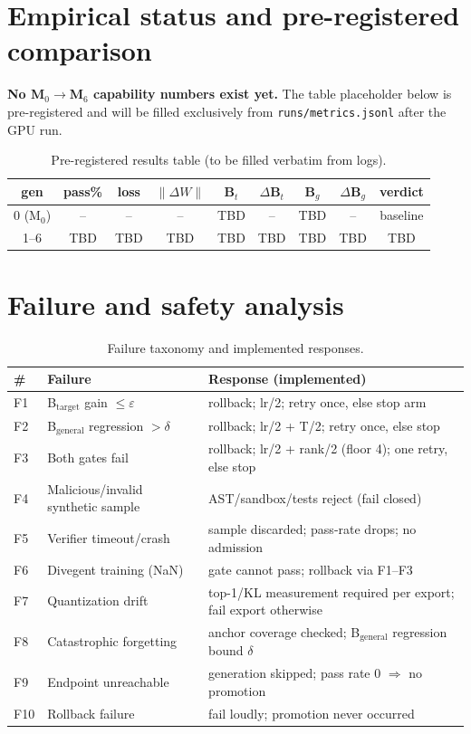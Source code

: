 \documentclass[11pt,a4paper]{article}
\begin{document}
\section{Empirical status and pre-registered comparison}\label{sec:pending}

\textbf{No M$_0{\rightarrow}$M$_6$ capability numbers exist yet.} The table
placeholder below is pre-registered and will be filled exclusively from
\texttt{runs/metrics.jsonl} after the GPU run.

\begin{table}[ht]
\centering
\small
\begin{tabular}{c c c c c c c c c}
\toprule
gen & pass\% & loss & $\lVert\Delta W\rVert$ & B$_t$ & $\Delta$B$_t$ & B$_g$ & $\Delta$B$_g$ & verdict \\
\midrule
0 (M$_0$) & -- & -- & -- & TBD & -- & TBD & -- & baseline \\
1--6 & TBD & TBD & TBD & TBD & TBD & TBD & TBD & TBD \\
\bottomrule
\end{tabular}
\caption{Pre-registered results table (to be filled verbatim from logs).}
\label{tab:pending}
\end{table}

\section{Failure and safety analysis}\label{sec:failure}

\begin{table}[ht]
\centering
\small
\begin{tabular}{L{0.9cm} L{4.6cm} L{6.6cm}}
\toprule
\# & \textbf{Failure} & \textbf{Response (implemented)} \\
\midrule
F1 & B$_{\mathrm{target}}$ gain $\le \varepsilon$ & rollback; lr/2; retry once, else stop arm \\
F2 & B$_{\mathrm{general}}$ regression $> \delta$ & rollback; lr/2 + T/2; retry once, else stop \\
F3 & Both gates fail & rollback; lr/2 + rank/2 (floor 4); one retry, else stop \\
F4 & Malicious/invalid synthetic sample & AST/sandbox/tests reject (fail closed) \\
F5 & Verifier timeout/crash & sample discarded; pass-rate drops; no admission \\
F6 & Divegent training (NaN) & gate cannot pass; rollback via F1--F3 \\
F7 & Quantization drift & top-1/KL measurement required per export; fail export otherwise \\
F8 & Catastrophic forgetting & anchor coverage checked; B$_{\mathrm{general}}$ regression bound $\delta$ \\
F9 & Endpoint unreachable & generation skipped; pass rate 0 $\Rightarrow$ no promotion \\
F10 & Rollback failure & fail loudly; promotion never occurred \\
\bottomrule
\end{tabular}
\caption{Failure taxonomy and implemented responses.}
\label{tab:failures}
\end{table}
\end{document}
